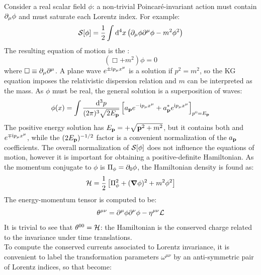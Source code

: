 Consider a real scalar field $ \phi $: a non-trivial Poincaré-invariant action must contain $ \partial_\mu \phi $ and must saturate each Lorentz index. For example:
\begin{equation}
  \mathcal{S}[\phi] = \frac{1}{2} \int \mathrm{d}^4 x \left( \partial_\mu \phi \partial^\mu \phi - m^2 \phi^2 \right)
\end{equation}
The resulting equation of motion is the :
\begin{equation}
  \left( \Box + m^2 \right) \phi = 0
\end{equation}
where $ \Box \equiv \partial_\mu \partial^\mu $. A plane wave $ e^{\pm \mathrm{i} p_\mu x^\mu} $ is a solution if $ p^2 = m^2 $, so the KG equation imposes the relativistic dispersion relation and $ m $ can be interpreted as the mass. As $ \phi $ must be real, the general solution is a superposition of waves:
\begin{equation}
  \phi(x) = \int \frac{\mathrm{d}^3 p}{(2\pi)^3 \sqrt{2E_{\mathbf{p}}}} \left[ a_{\mathbf{p}} e^{-\mathrm{i} p_\mu x^\mu} + a^*_{\mathbf{p}} e^{\mathrm{i} p_\mu x^\mu} \right]_{p^0 = E_{\mathbf{p}}}
  \label{eq:scalar-field-exp}
\end{equation}
The positive energy solution has $ E_{\mathbf{p}} = + \sqrt{\mathbf{p}^2 + m^2} $, but it contains both  and  $ e^{\mp \mathrm{i} p_\mu x^\mu} $, while the $ (2E_{\mathbf{p}})^{-1/2} $ factor is a convenient normalization of the $ a_{\mathbf{p}} $ coefficients. The overall normalization of $ \mathcal{S}[\phi] $ does not influence the equations of motion, however it is important for obtaining a positive-definite Hamiltonian. As the momentum conjugate to $ \phi $ is $ \Pi_\phi = \partial_0 \phi $, the Hamiltonian density is found as:
\begin{equation}
  \mathcal{H} = \frac{1}{2} \left[ \Pi_\phi^2 + (\boldsymbol{\nabla} \phi)^2 + m^2 \phi^2 \right]
  \label{eq:scalar-field-haml}
\end{equation}
The energy-momentum tensor is computed to be:
\begin{equation}
  \theta^{\mu \nu} = \partial^\mu \phi \partial^\nu \phi - \eta^{\mu \nu} \mathcal{L}
  \label{eq:scalar-field-en-mom-tens}
\end{equation}
It is trivial to see that $ \theta^{00} = \mathcal{H} $: the Hamiltonian is the conserved charge related to the invariance under time translations.\\
To compute the conserved currents associated to Lorentz invariance, it is convenient to label the transformation parameters $ \omega^{\mu \nu} $ by an anti-symmetric pair of Lorentz indices, so that  become:
